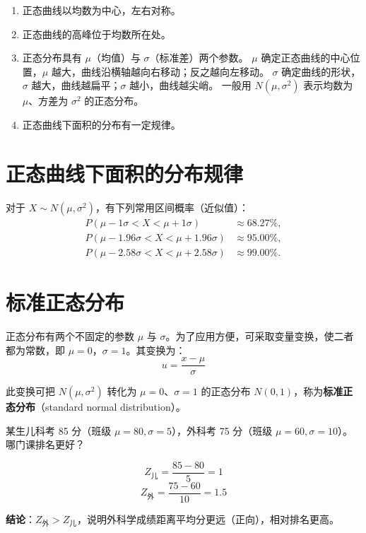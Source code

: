 \documentclass[lang=cn,10pt]{elegantbook}
\begin{document}
\begin{enumerate}
\item 正态曲线以均数为中心，左右对称。
\item 正态曲线的高峰位于均数所在处。
\item 正态分布具有 $\mu$（均值）与 $\sigma$（标准差）两个参数。
  $\mu$ 确定正态曲线的中心位置，$\mu$ 越大，曲线沿横轴越向右移动；反之越向左移动。
  $\sigma$ 确定曲线的形状，$\sigma$ 越大，曲线越扁平；$\sigma$ 越小，曲线越尖峭。
  一般用 $N(\mu,\sigma^2)$ 表示均数为 $\mu$、方差为 $\sigma^2$ 的正态分布。
\item 正态曲线下面积的分布有一定规律。
\end{enumerate}




\section{正态曲线下面积的分布规律}

对于 $X\sim N(\mu,\sigma^2)$，有下列常用区间概率（近似值）：
\begin{align*}
P(\mu-1\sigma<X<\mu+1\sigma) &\approx 68.27\%,\\
P(\mu-1.96\sigma<X<\mu+1.96\sigma) &\approx 95.00\%,\\
P(\mu-2.58\sigma<X<\mu+2.58\sigma) &\approx 99.00\%.
\end{align*}

\section{标准正态分布}

正态分布有两个不固定的参数 $\mu$ 与 $\sigma$。为了应用方便，可采取变量变换，使二者都为常数，即 $\mu=0$，$\sigma=1$。其变换为：
\begin{equation}
 u=\frac{x-\mu}{\sigma}
\end{equation}

此变换可把 $N(\mu,\sigma^2)$ 转化为 $\mu=0$、$\sigma=1$ 的正态分布 $N(0,1)$，称为\textbf{标准正态分布}（standard normal distribution）。

\vspace{0.2cm}
\begin{exercise}
    某生儿科考 85 分（班级 $\mu=80, \sigma=5$），外科考 75 分（班级 $\mu=60, \sigma=10$）。哪门课排名更好？
\end{exercise}

\vspace{0.2cm}
\begin{solution}
    \[ Z_{\text{儿}} = \frac{85 - 80}{5} = 1 \]
\[ Z_{\text{外}} = \frac{75 - 60}{10} = 1.5 \]

\textbf{结论}：$Z_{\text{外}} > Z_{\text{儿}}$，说明外科学成绩距离平均分更远（正向），相对排名更高。
\end{solution}
\end{document}
